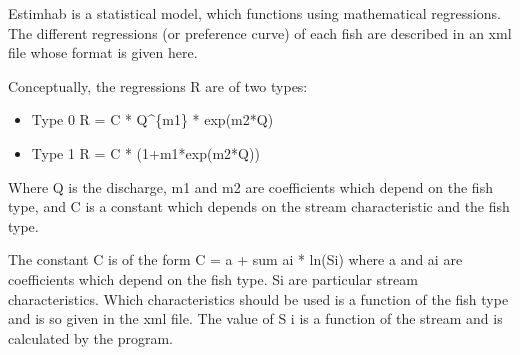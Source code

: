 \documentclass[letterpaper,10pt,english]{sphinxmanual}
\begin{document}
Estimhab is a statistical model, which functions using mathematical regressions.
The different regressions (or preference curve) of each fish are described in an xml file
whose format is given here.

Conceptually, the regressions R are of two types:
\begin{itemize}
\item {} 
Type 0          R = C * Q\textasciicircum{}\{m1\} * exp(m2*Q)

\item {} 
Type 1          R = C * (1+m1*exp(m2*Q))

\end{itemize}

Where Q is the discharge, m1 and m2 are coefficients which depend on the fish type, and C is a
constant which depends on the stream characteristic and the fish type.

The constant C is of the form C = a + sum ai * ln(Si) where a and ai are coefficients which depend on
the fish type. Si are particular stream characteristics. Which characteristics should be used is a
function of the fish type and is so given in the xml file. The value of S i is a function of the stream
and is calculated by the program.
\end{document}
